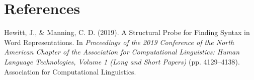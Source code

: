 \documentclass[11pt]{article}
\begin{document}
\section*{References}
Hewitt, J., \& Manning, C. D. (2019). A Structural Probe for Finding Syntax in Word Representations. In \textit{Proceedings of the 2019 Conference of the North American Chapter of the Association for Computational Linguistics: Human Language Technologies, Volume 1 (Long and Short Papers)} (pp. 4129–4138). Association for Computational Linguistics.
\end{document}
